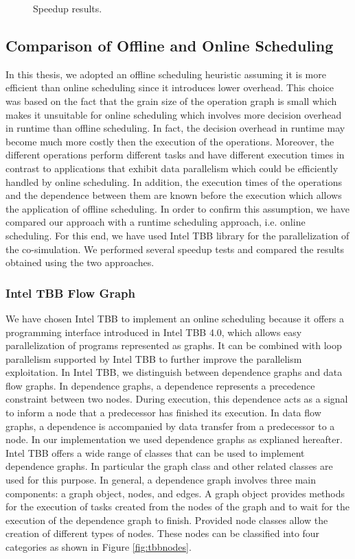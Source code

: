 \begin{figure}[phbt]
\centering

\caption{Speedup results.}
\label{fig:spdup}
\end{figure}  

\subsection{Comparison of Offline and Online Scheduling}

In this thesis, we adopted an offline scheduling heuristic assuming it is more efficient than online scheduling since it introduces lower overhead. This choice was based on the fact that the grain size of the operation graph is small which makes it unsuitable for online scheduling which involves more decision overhead in runtime than offline scheduling. In fact, the decision overhead in runtime may become much more costly then the execution of the operations. Moreover, the different operations perform different tasks and have different execution times in contrast to applications that exhibit data parallelism which could be efficiently handled by online scheduling. In addition, the execution times of the operations and the dependence between them are known before the execution which allows the application of offline scheduling. In order to confirm this assumption, we have compared our approach with a runtime scheduling approach, i.e. online scheduling. For this end, we have used Intel TBB library for the parallelization of the co-simulation. We performed several speedup tests and compared the results obtained using the two approaches.

\subsubsection{Intel TBB Flow Graph}

We have chosen Intel TBB to implement an online scheduling because it offers a programming interface introduced in Intel TBB 4.0, which allows easy parallelization of programs represented as graphs. 
It can be combined with loop parallelism supported by Intel TBB to further improve the parallelism exploitation. 
In Intel TBB, we distinguish between dependence graphs and data flow graphs.
In dependence graphs, a dependence represents a precedence constraint between two nodes. During execution, this dependence acts as a signal to inform a node that a predecessor has finished its execution. 
In data flow graphs, a dependence is accompanied by data transfer from a predecessor to a node.
In our implementation we used dependence graphs as explianed hereafter.
Intel TBB offers a wide range of classes that can be used to implement dependence graphs. In particular the graph class and other related classes are used for this purpose. In general, a dependence graph involves three main components: a graph object, nodes, and edges. A graph object provides methods for the execution of tasks created from the nodes of the graph and to wait for the execution of the dependence graph to finish.
Provided node classes allow the creation of different types of nodes. These nodes can be classified into four categories as shown in Figure \ref{fig:tbbnodes}.

